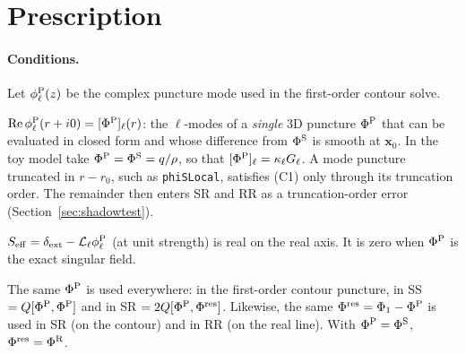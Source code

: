 \documentclass[11pt,a4paper]{article}
\renewcommand{\Re}{\operatorname{Re}}
\newcommand{\dext}{\delta_{\rm ext}}
\newcommand{\Lop}{\mathcal{L}_\ell}
\newcommand{\PhiS}{\Phi^{\rm S}}
\newcommand{\PhiR}{\Phi^{\rm R}}
\newcommand{\x}{\mathbf{x}}
\newcommand{\code}[1]{\texttt{#1}}
\begin{document}
\section{Prescription}\label{sec:prescription}

\paragraph{Conditions.}
Let $\phi^{\rm P}_\ell(z)$ be the complex puncture mode used in the first-order contour solve.
\begin{description}[nosep,font=\normalfont\bfseries]
\item[(C1)] $\Re\phi^{\rm P}_\ell(r+i0)=[\Phi^{\rm P}]_\ell(r)$: the $\ell$-modes of a \emph{single} 3D puncture $\Phi^{\rm P}$ that can be evaluated in closed form and whose difference from $\PhiS$ is smooth at $\x_0$.
  In the toy model take $\Phi^{\rm P}=\PhiS=q/\rho$, so that $[\Phi^{\rm P}]_\ell=\kappa_\ell G_\ell$.
  A mode puncture truncated in $r-r_0$, such as \code{phiSLocal}, satisfies (C1) only through its truncation order.
  The remainder then enters SR and RR as a truncation-order error (Section~\ref{sec:shadowtest}).
\item[(C2)] $S_{\rm eff}=\dext-\Lop\phi^{\rm P}_\ell$ (at unit strength) is real on the real axis.
  It is zero when $\Phi^{\rm P}$ is the exact singular field.
\item[(C3)] The same $\Phi^{\rm P}$ is used everywhere: in the first-order contour puncture, in SS $=Q[\Phi^{\rm P},\Phi^{\rm P}]$ and in SR $=2Q[\Phi^{\rm P},\Phi^{\rm res}]$.
  Likewise, the same $\Phi^{\rm res}=\Phi_1-\Phi^{\rm P}$ is used in SR (on the contour) and in RR (on the real line).
  With $\Phi^{\rm P}=\PhiS$, $\Phi^{\rm res}=\PhiR$.
\end{description}
\end{document}
